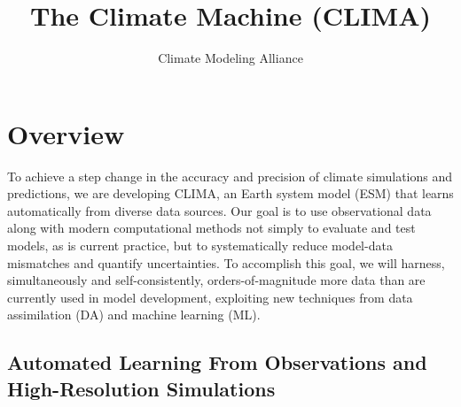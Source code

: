 \documentclass{article}
\title{The Climate Machine (CLIMA)}
\author{Climate Modeling Alliance}
\begin{document}
\maketitle

\section{Overview}

To achieve a step change in the accuracy and precision of climate simulations and predictions, we are developing CLIMA, an Earth system model (ESM) that learns automatically from diverse data sources. Our goal is to use observational data along with modern computational methods not simply to evaluate and test models, as is current practice, but to systematically reduce model-data mismatches and quantify uncertainties. To accomplish this goal, we will harness, simultaneously and self-consistently, orders-of-magnitude more data than are currently used in model development, exploiting new techniques from data assimilation (DA) and machine learning (ML).

\subsection{Automated Learning From Observations and High-Resolution Simulations}
\end{document}
